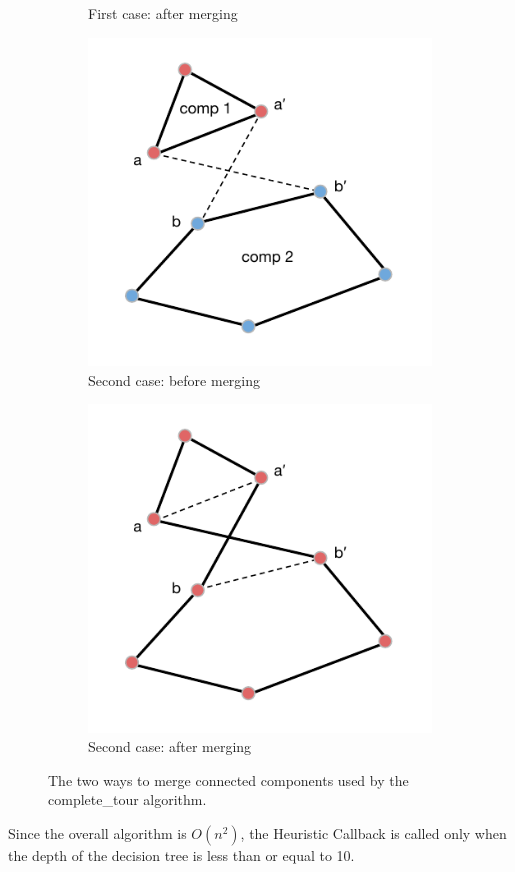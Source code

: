 \begin{figure}[h!]
\begin{subfigure}[b]{0.49\linewidth}
    \caption{First case: after merging}
  \end{subfigure}
  \begin{subfigure}[b]{0.49\linewidth}
    \includegraphics[width=\linewidth]{media/HEU-2_.pdf}
    \caption{Second case: before merging}
  \end{subfigure}
  \begin{subfigure}[b]{0.49\linewidth}
    \includegraphics[width=\linewidth]{media/HEU-2solved2prova.pdf}
    \caption{Second case: after merging}
  \end{subfigure}
  \caption{The two ways to merge connected components used by the complete\_tour algorithm.}
  \label{fig:completetour}
\end{figure}
\clearpage
\noindent
Since the overall algorithm is $O(n^2)$, the Heuristic Callback is called only when the depth of the decision tree is less than or equal to 10.
